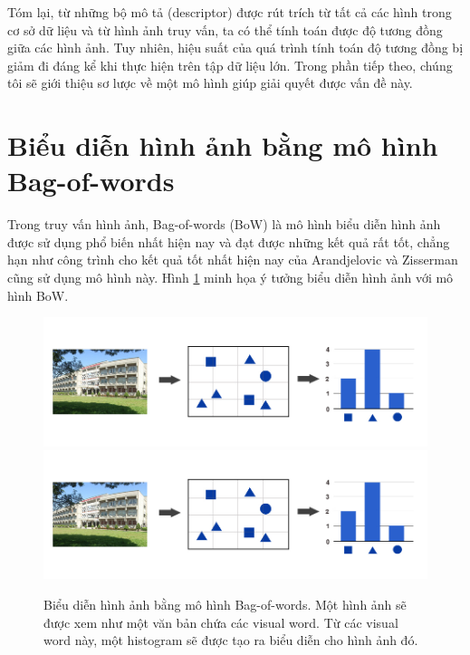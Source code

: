 Tóm lại, từ những bộ mô tả (descriptor) được rút trích từ tất cả các hình trong cơ sở dữ liệu và từ hình ảnh truy vấn, ta có thể tính toán được độ tương đồng giữa các hình ảnh. Tuy nhiên, hiệu suất của quá trình tính toán độ tương đồng bị giảm đi đáng kể khi thực hiện trên tập dữ liệu lớn. Trong phần tiếp theo, chúng tôi sẽ giới thiệu sơ lược về một mô hình giúp giải quyết được vấn đề này.

\section{Biểu diễn hình ảnh bằng mô hình Bag-of-words}
\label{bag-of-words}
Trong truy vấn hình ảnh, Bag-of-words (BoW) là mô hình biểu diễn hình ảnh được sử dụng phổ biến nhất hiện nay và đạt được những kết quả rất tốt, chẳng hạn như công trình cho kết quả tốt nhất hiện nay của Arandjelovic và Zisserman\cite{arandjelovic2012three} cũng sử dụng mô hình này. Hình \ref{FigBoWPreview} minh họa ý tưởng biểu diễn hình ảnh với mô hình BoW.

\begin{figure}[!htbp]
  \begin{center}
    \leavevmode
    \ifpdf
      \includegraphics[scale=0.45]{bow-preview}
    \else
      \includegraphics[scale=0.45]{bow-preview}
    \fi
    \caption[Biểu diễn hình ảnh bằng mô hình Bag-of-words]{Biểu diễn hình ảnh bằng mô hình Bag-of-words. Một hình ảnh sẽ được xem như một văn bản chứa các visual word. Từ các visual word này, một histogram sẽ được tạo ra biểu diễn cho hình ảnh đó.}
    \label{FigBoWPreview}
  \end{center}
\end{figure}

